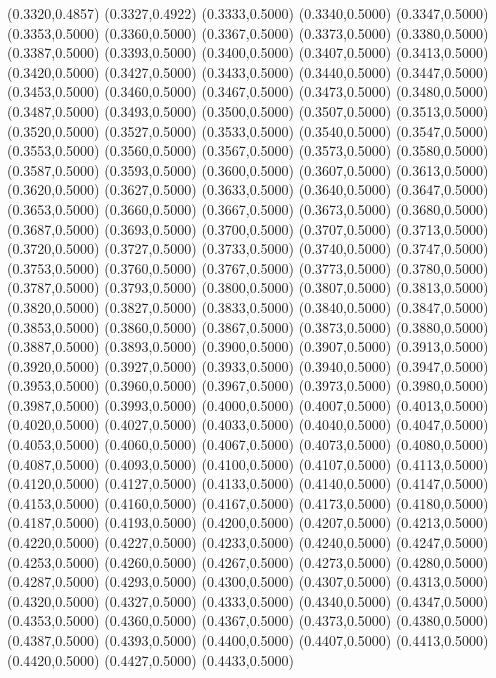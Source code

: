 {(0.3320,0.4857) (0.3327,0.4922) (0.3333,0.5000) (0.3340,0.5000) (0.3347,0.5000) (0.3353,0.5000)
(0.3360,0.5000) (0.3367,0.5000) (0.3373,0.5000) (0.3380,0.5000) (0.3387,0.5000) (0.3393,0.5000)
(0.3400,0.5000) (0.3407,0.5000) (0.3413,0.5000) (0.3420,0.5000) (0.3427,0.5000) (0.3433,0.5000)
(0.3440,0.5000) (0.3447,0.5000) (0.3453,0.5000) (0.3460,0.5000) (0.3467,0.5000) (0.3473,0.5000)
(0.3480,0.5000) (0.3487,0.5000) (0.3493,0.5000) (0.3500,0.5000) (0.3507,0.5000) (0.3513,0.5000)
(0.3520,0.5000) (0.3527,0.5000) (0.3533,0.5000) (0.3540,0.5000) (0.3547,0.5000) (0.3553,0.5000)
(0.3560,0.5000) (0.3567,0.5000) (0.3573,0.5000) (0.3580,0.5000) (0.3587,0.5000) (0.3593,0.5000)
(0.3600,0.5000) (0.3607,0.5000) (0.3613,0.5000) (0.3620,0.5000) (0.3627,0.5000) (0.3633,0.5000)
(0.3640,0.5000) (0.3647,0.5000) (0.3653,0.5000) (0.3660,0.5000) (0.3667,0.5000) (0.3673,0.5000)
(0.3680,0.5000) (0.3687,0.5000) (0.3693,0.5000) (0.3700,0.5000) (0.3707,0.5000) (0.3713,0.5000)
(0.3720,0.5000) (0.3727,0.5000) (0.3733,0.5000) (0.3740,0.5000) (0.3747,0.5000) (0.3753,0.5000)
(0.3760,0.5000) (0.3767,0.5000) (0.3773,0.5000) (0.3780,0.5000) (0.3787,0.5000) (0.3793,0.5000)
(0.3800,0.5000) (0.3807,0.5000) (0.3813,0.5000) (0.3820,0.5000) (0.3827,0.5000) (0.3833,0.5000)
(0.3840,0.5000) (0.3847,0.5000) (0.3853,0.5000) (0.3860,0.5000) (0.3867,0.5000) (0.3873,0.5000)
(0.3880,0.5000) (0.3887,0.5000) (0.3893,0.5000) (0.3900,0.5000) (0.3907,0.5000) (0.3913,0.5000)
(0.3920,0.5000) (0.3927,0.5000) (0.3933,0.5000) (0.3940,0.5000) (0.3947,0.5000) (0.3953,0.5000)
(0.3960,0.5000) (0.3967,0.5000) (0.3973,0.5000) (0.3980,0.5000) (0.3987,0.5000) (0.3993,0.5000)
(0.4000,0.5000) (0.4007,0.5000) (0.4013,0.5000) (0.4020,0.5000) (0.4027,0.5000) (0.4033,0.5000)
(0.4040,0.5000) (0.4047,0.5000) (0.4053,0.5000) (0.4060,0.5000) (0.4067,0.5000) (0.4073,0.5000)
(0.4080,0.5000) (0.4087,0.5000) (0.4093,0.5000) (0.4100,0.5000) (0.4107,0.5000) (0.4113,0.5000)
(0.4120,0.5000) (0.4127,0.5000) (0.4133,0.5000) (0.4140,0.5000) (0.4147,0.5000) (0.4153,0.5000)
(0.4160,0.5000) (0.4167,0.5000) (0.4173,0.5000) (0.4180,0.5000) (0.4187,0.5000) (0.4193,0.5000)
(0.4200,0.5000) (0.4207,0.5000) (0.4213,0.5000) (0.4220,0.5000) (0.4227,0.5000) (0.4233,0.5000)
(0.4240,0.5000) (0.4247,0.5000) (0.4253,0.5000) (0.4260,0.5000) (0.4267,0.5000) (0.4273,0.5000)
(0.4280,0.5000) (0.4287,0.5000) (0.4293,0.5000) (0.4300,0.5000) (0.4307,0.5000) (0.4313,0.5000)
(0.4320,0.5000) (0.4327,0.5000) (0.4333,0.5000) (0.4340,0.5000) (0.4347,0.5000) (0.4353,0.5000)
(0.4360,0.5000) (0.4367,0.5000) (0.4373,0.5000) (0.4380,0.5000) (0.4387,0.5000) (0.4393,0.5000)
(0.4400,0.5000) (0.4407,0.5000) (0.4413,0.5000) (0.4420,0.5000) (0.4427,0.5000) (0.4433,0.5000)
}
